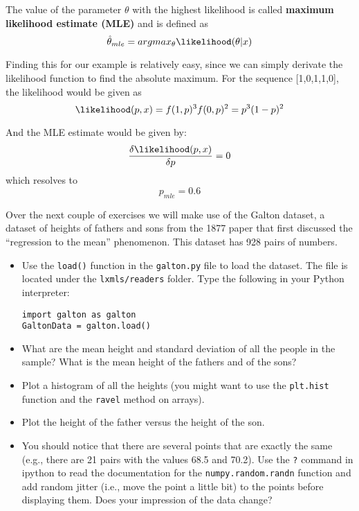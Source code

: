 The value of the parameter $\theta$ with the highest likelihood is called {\bf maximum likelihood estimate (MLE)} and is defined as
\begin{equation*}
\hat{\theta}_{mle}=argmax_{\theta}\likelihood(\theta|x)
\end{equation*}

Finding this for our example is relatively easy, since we can simply derivate the likelihood function to find the absolute maximum. For the sequence [1,0,1,1,0], the likelihood would be given as
\begin{equation*}
\likelihood(p,x) = f(1,p)^3f(0,p)^2 = p^3(1-p)^2
\end{equation*}

And the MLE estimate would be given by:
\begin{equation*}
\frac{\delta \likelihood(p,x)}{\delta p}=0
\end{equation*}
which resolves to
\begin{equation*}
p_{mle}=0.6
\end{equation*}

\begin{exercise}
Over the next couple of exercises we will make use of the Galton dataset, a dataset of heights of fathers and sons from the 1877 paper that first discussed the ``regression to the mean'' phenomenon. This dataset has 928 pairs of numbers.
\begin{itemize}
\item Use the \texttt{load()} function in the \texttt{galton.py} file to load the dataset. The file is located under the \texttt{lxmls/readers} folder. Type the following in your Python interpreter:
\begin{verbatim}
import galton as galton
GaltonData = galton.load()
\end{verbatim}
\item What are the mean height and standard deviation of all the people in the sample? What is the mean height of the fathers and of the sons?
\item Plot a histogram of all the heights (you might want to use the \texttt{plt.hist} function and the \texttt{ravel} method on arrays).
\item Plot the height of the father versus the height of the son.
\item You should notice that there are several points that are exactly the same (e.g., there are 21 pairs with the values 68.5 and 70.2). Use the \texttt{?} command in ipython to read the documentation for the \texttt{numpy.random.randn} function and add random jitter (i.e., move the point a little bit) to the points before displaying them. Does your impression of the data change?
\end{itemize}
\end{exercise}

